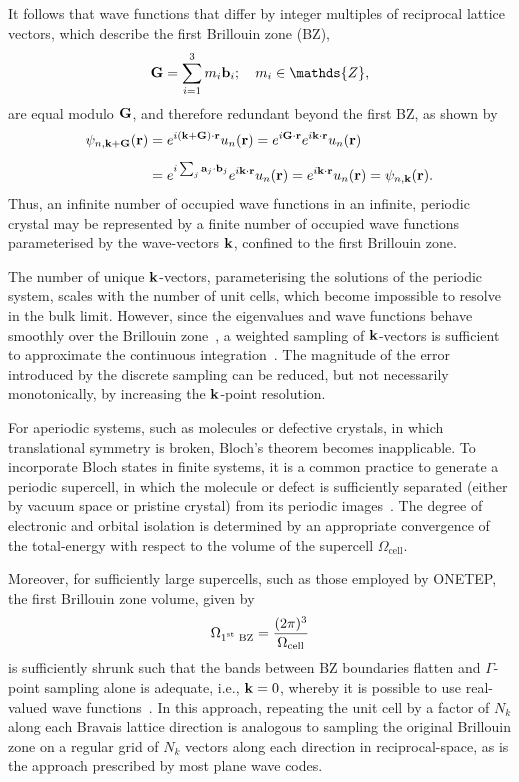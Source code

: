 {%
It follows that wave functions that 
differ by integer multiples of 
reciprocal lattice vectors, 
which describe the first Brillouin zone (BZ), 
%
\begin{equation}
{\bf G}=\sum_{i=1}^3 m_i {\bf b}_i;
\quad
m_i \in \mathds{Z}, 
\end{equation}
%
are equal modulo ${\bf G}$, 
and therefore redundant beyond  
the first BZ, as shown by
%
\begin{align}
\psi_{n, {{\bf k}+\bf G}}({\bf r})&=e^{i({{\bf k}+{\bf G}})\cdot {\bf r}}u_n({\bf r})
=e^{i{\bf G}\cdot {\bf r}}e^{i{{\bf k}}\cdot {\bf r}}u_n({\bf r})\nonumber \\[0.5em]
&=e^{i\sum_j{\bf a}_j\cdot {\bf b}_j}e^{i{{\bf k}}\cdot {\bf r}}u_n({\bf r})  
=e^{i{{\bf k}}\cdot {\bf r}}u_n({\bf r})
=\psi_{n,{\bf k}}({\bf r}).
\end{align}
%
Thus, an infinite number 
of occupied wave functions 
in an infinite, periodic crystal 
may be represented by 
a finite number of occupied 
wave functions parameterised 
by the wave-vectors ${\bf k}$, 
confined to the first Brillouin zone.}

{
The number of unique ${\bf k}$-vectors,
parameterising the solutions of the periodic system, 
scales with the number of unit cells, 
which become impossible to resolve 
in the bulk limit.
%
However, 
since the eigenvalues and wave functions 
behave smoothly over the Brillouin zone~\cite{PhysRev.50.58}, 
a weighted sampling of ${\bf k}$-vectors 
is sufficient to approximate the 
continuous integration~\cite{PhysRevB.8.5747,PhysRevB.13.5188}. 
%
The magnitude of the 
error introduced by 
the discrete sampling 
can be reduced, 
but not necessarily {monotonically},  
by increasing the ${\bf k}$-point resolution.}

{
For aperiodic systems, 
such as molecules or {defective} crystals,
in which translational symmetry is broken, 
Bloch's theorem becomes inapplicable.
%
To incorporate Bloch states 
in finite systems, 
it is {a common} practice to generate a 
periodic supercell, 
in which the molecule or defect 
is sufficiently separated  
(either by vacuum space or pristine crystal) 
from its periodic images~\cite{PhysRevB.51.4014}.
%
The degree of electronic and orbital isolation
is determined by an 
appropriate convergence 
of the total-energy 
with respect to the 
volume of the supercell $\Omega_\textrm{cell}$.}

{
Moreover, 
for sufficiently large supercells, 
such as those employed by {\sc ONETEP}, 
the first Brillouin zone volume, 
given by 
%
\begin{equation}
\Omega_\textrm{1\textsuperscript{st} BZ} = \frac{(2\pi)^3}{\Omega_\textrm{cell}}
\end{equation}
%
is sufficiently shrunk  
such that the bands between 
BZ boundaries flatten 
and $\Gamma$-point 
sampling alone is adequate, 
{
i.e., ${\bf k}=0$, 
whereby it is possible 
to use real-valued wave functions~\cite{0953-8984-20-29-294207}}.
%
In this approach, 
repeating the unit cell by a factor of $N_k$ 
along each Bravais lattice direction 
is analogous to sampling the original Brillouin zone
on a regular grid of $N_k$ vectors 
along each direction in reciprocal-space, 
as is the approach prescribed 
by most plane wave codes.}


